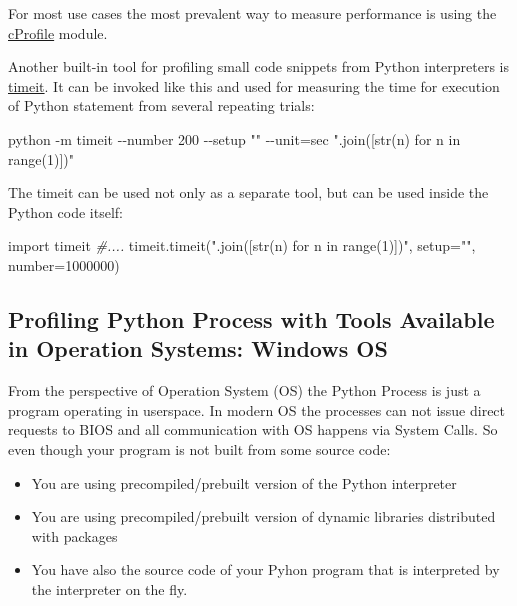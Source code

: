 \documentclass[
]{article}
\newenvironment{Shaded}{}{}
\newcommand{\AttributeTok}[1]{\textcolor[rgb]{0.49,0.56,0.16}{#1}}
\newcommand{\CommentTok}[1]{\textcolor[rgb]{0.38,0.63,0.69}{\textit{#1}}}
\newcommand{\DecValTok}[1]{\textcolor[rgb]{0.25,0.63,0.44}{#1}}
\newcommand{\ExtensionTok}[1]{#1}
\newcommand{\ImportTok}[1]{#1}
\newcommand{\NormalTok}[1]{#1}
\newcommand{\OperatorTok}[1]{\textcolor[rgb]{0.40,0.40,0.40}{#1}}
\newcommand{\StringTok}[1]{\textcolor[rgb]{0.25,0.44,0.63}{#1}}
\begin{document}
For most use cases the most prevalent way to measure performance is
using the
\href{https://docs.python.org/3/library/profile.html\#module-cProfile}{cProfile}
module.

Another built-in tool for profiling small code snippets from Python
interpreters is
\href{https://docs.python.org/3/library/timeit.html}{timeit}. It can be
invoked like this and used for measuring the time for execution of
Python statement from several repeating trials:

\begin{Shaded}
\begin{Highlighting}[]
\ExtensionTok{python} \AttributeTok{{-}m}\NormalTok{ timeit }\AttributeTok{{-}{-}number}\NormalTok{ 200 }\AttributeTok{{-}{-}setup} \StringTok{""} \AttributeTok{{-}{-}unit}\OperatorTok{=}\NormalTok{sec }\StringTok{"\textquotesingle{}{-}\textquotesingle{}.join([str(n) for n in range(1)])"}
\end{Highlighting}
\end{Shaded}

The timeit can be used not only as a separate tool, but can be used
inside the Python code itself:

\begin{Shaded}
\begin{Highlighting}[]
\ImportTok{import}\NormalTok{ timeit}
\CommentTok{\#....}
\NormalTok{timeit.timeit(}\StringTok{"\textquotesingle{}{-}\textquotesingle{}.join([str(n) for n in range(1)])"}\NormalTok{, setup}\OperatorTok{=}\StringTok{""}\NormalTok{, number}\OperatorTok{=}\DecValTok{1000000}\NormalTok{)}
\end{Highlighting}
\end{Shaded}

\hypertarget{profiling-python-process-with-tools-available-in-operation-systems-windows-os}{%
\subsection{Profiling Python Process with Tools Available in Operation
Systems: Windows
OS}\label{profiling-python-process-with-tools-available-in-operation-systems-windows-os}}

From the perspective of Operation System (OS) the Python Process is just
a program operating in userspace. In modern OS the processes can not
issue direct requests to BIOS and all communication with OS happens via
System Calls. So even though your program is not built from some source
code:

\begin{itemize}
\item
  You are using precompiled/prebuilt version of the Python interpreter
\item
  You are using precompiled/prebuilt version of dynamic libraries
  distributed with packages
\item
  You have also the source code of your Pyhon program that is
  interpreted by the interpreter on the fly.
\end{itemize}
\end{document}
